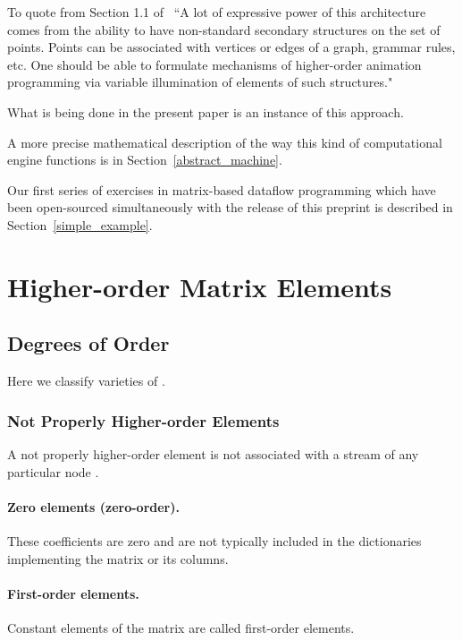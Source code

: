 \documentclass[withtimes]{easychair}
\begin{document}
To quote from Section 1.1 of~\cite{MBukatinMatthewsLinear}
``A lot of expressive power of this architecture comes from the ability to have non-standard secondary structures on the set of points.
Points can be associated with vertices or edges of a graph, grammar rules, etc. One should be able to formulate
mechanisms of higher-order animation programming via variable illumination of elements of such structures."

What is being done in the present paper is an instance of this approach.

A more precise mathematical description of the way this kind of computational engine functions
is in Section~\ref{abstract_machine}.

Our first series of exercises in matrix-based dataflow programming which have been open-sourced simultaneously with the release of this
preprint is described in Section~\ref{simple_example}.

\section{Higher-order Matrix Elements}\label{higher_elements}

\subsection{Degrees of Order}

Here we classify varieties of .

\subsubsection{Not Properly Higher-order Elements}

A not properly higher-order element  is not associated with a stream of any particular node .

\paragraph{Zero elements (zero-order).}

These coefficients are zero and are not typically included in the dictionaries implementing the matrix or its columns.

\paragraph{First-order elements.} Constant elements of the matrix  are called first-order elements.
\end{document}
